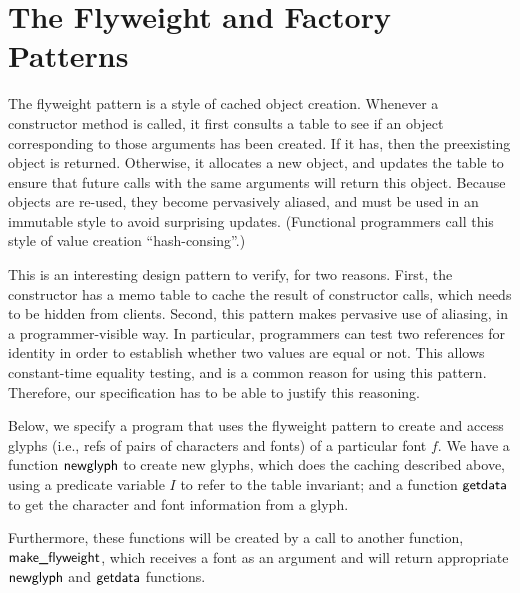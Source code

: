 \documentclass[preprint,natbib]{sigplanconf}
\begin{document}
\section{The Flyweight and Factory Patterns}

The flyweight pattern is a style of cached object creation. Whenever a
constructor method is called, it first consults a table to see if an
object corresponding to those arguments has been created. If it has,
then the preexisting object is returned.  Otherwise, it allocates a
new object, and updates the table to ensure that future calls with the
same arguments will return this object. Because objects are re-used,
they become pervasively aliased, and must be used in an immutable
style to avoid surprising updates. (Functional programmers call this
style of value creation ``hash-consing''.)

This is an interesting design pattern to verify, for two reasons.
First, the constructor has a memo table to cache the result of
constructor calls, which needs to be hidden from clients. Second, this
pattern makes pervasive use of aliasing, in a programmer-visible
way. In particular, programmers can test two references for identity
in order to establish whether two values are equal or not. This allows
constant-time equality testing, and is a common reason for using this
pattern. Therefore, our specification has to be able to justify this
reasoning.

Below, we specify a program that uses the flyweight pattern to create
and access glyphs (i.e., refs of pairs of characters and fonts) of a
particular font $f$. We have a function $\mbox{\textsf{{newglyph}}}$ to create
new glyphs, which does the caching described above, using a predicate
variable $I$ to refer to the table invariant; and a function
$\mbox{\textsf{{getdata}}}$ to get the character and font information from a
glyph.

Furthermore, these functions will be created by a call to another
function, $\mbox{\textsf{{make\_flyweight}}}$, which receives a font as an
argument and will return appropriate $\mbox{\textsf{{newglyph}}}$ and
$\mbox{\textsf{{getdata}}}$ functions. 
\end{document}
